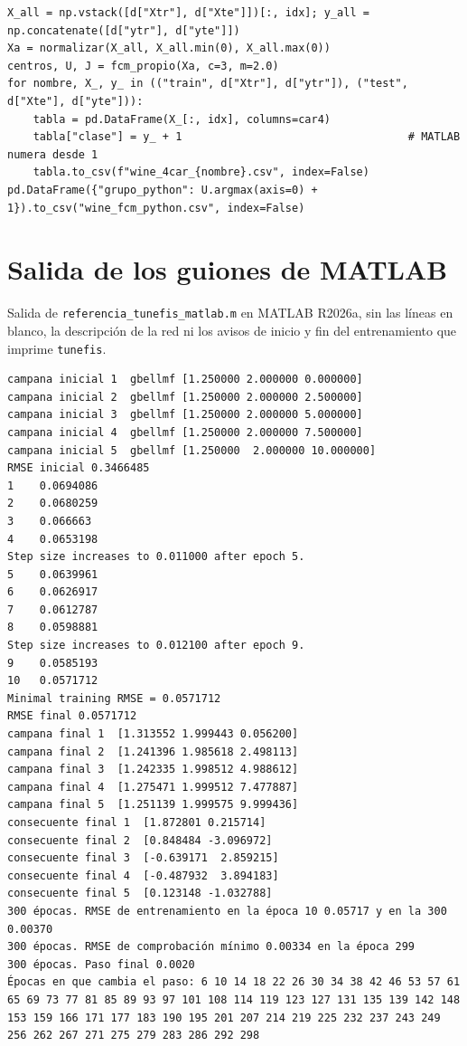 \documentclass[11pt,letterpaper]{article}
\begin{document}
\begin{lstlisting}[caption={TODO 6, FCM y exportación para MATLAB}]
X_all = np.vstack([d["Xtr"], d["Xte"]])[:, idx]; y_all = np.concatenate([d["ytr"], d["yte"]])
Xa = normalizar(X_all, X_all.min(0), X_all.max(0))
centros, U, J = fcm_propio(Xa, c=3, m=2.0)
for nombre, X_, y_ in (("train", d["Xtr"], d["ytr"]), ("test", d["Xte"], d["yte"])):
    tabla = pd.DataFrame(X_[:, idx], columns=car4)
    tabla["clase"] = y_ + 1                                   # MATLAB numera desde 1
    tabla.to_csv(f"wine_4car_{nombre}.csv", index=False)
pd.DataFrame({"grupo_python": U.argmax(axis=0) + 1}).to_csv("wine_fcm_python.csv", index=False)
\end{lstlisting}

\section{Salida de los guiones de MATLAB}
\label{anexo:matlab}

Salida de \texttt{referencia\_tunefis\_matlab.m} en MATLAB R2026a, sin las líneas en blanco, la descripción de la red ni los avisos de inicio y fin del entrenamiento que imprime \texttt{tunefis}.

\begin{lstlisting}[language={}, numbers=none, caption={Salida de referencia\_tunefis\_matlab.m}]
campana inicial 1  gbellmf [1.250000 2.000000 0.000000]
campana inicial 2  gbellmf [1.250000 2.000000 2.500000]
campana inicial 3  gbellmf [1.250000 2.000000 5.000000]
campana inicial 4  gbellmf [1.250000 2.000000 7.500000]
campana inicial 5  gbellmf [1.250000  2.000000 10.000000]
RMSE inicial 0.3466485
1    0.0694086
2    0.0680259
3    0.066663
4    0.0653198
Step size increases to 0.011000 after epoch 5.
5    0.0639961
6    0.0626917
7    0.0612787
8    0.0598881
Step size increases to 0.012100 after epoch 9.
9    0.0585193
10   0.0571712
Minimal training RMSE = 0.0571712
RMSE final 0.0571712
campana final 1  [1.313552 1.999443 0.056200]
campana final 2  [1.241396 1.985618 2.498113]
campana final 3  [1.242335 1.998512 4.988612]
campana final 4  [1.275471 1.999512 7.477887]
campana final 5  [1.251139 1.999575 9.999436]
consecuente final 1  [1.872801 0.215714]
consecuente final 2  [0.848484 -3.096972]
consecuente final 3  [-0.639171  2.859215]
consecuente final 4  [-0.487932  3.894183]
consecuente final 5  [0.123148 -1.032788]
300 épocas. RMSE de entrenamiento en la época 10 0.05717 y en la 300 0.00370
300 épocas. RMSE de comprobación mínimo 0.00334 en la época 299
300 épocas. Paso final 0.0020
Épocas en que cambia el paso: 6 10 14 18 22 26 30 34 38 42 46 53 57 61 65 69 73 77 81 85 89 93 97 101 108 114 119 123 127 131 135 139 142 148 153 159 166 171 177 183 190 195 201 207 214 219 225 232 237 243 249 256 262 267 271 275 279 283 286 292 298
\end{lstlisting}
\end{document}
